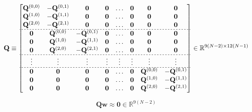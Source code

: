 \begin{equation}\label{eq:Qmat}
\mathbf{Q}
\equiv
\begin{bmatrix}
\mathbf{Q}^{(0,0)} & -\mathbf{Q}^{(0,1)} & \mathbf{0} & \mathbf{0} & \hdots & \mathbf{0} & \mathbf{0} & \mathbf{0}\\
\mathbf{Q}^{(1,0)} & -\mathbf{Q}^{(1,1)} & \mathbf{0} & \mathbf{0} & \hdots & \mathbf{0} & \mathbf{0} & \mathbf{0}\\
\mathbf{Q}^{(2,0)} & -\mathbf{Q}^{(2,1)} & \mathbf{0} & \mathbf{0} & \hdots & \mathbf{0} & \mathbf{0} & \mathbf{0}\\ \hdashline[2pt/2pt]
\mathbf{0} & \mathbf{Q}^{(0,0)} & -\mathbf{Q}^{(0,1)} & \mathbf{0} & \hdots & \mathbf{0} & \mathbf{0} & \mathbf{0}\\
\mathbf{0} & \mathbf{Q}^{(1,0)} & -\mathbf{Q}^{(1,1)} & \mathbf{0} & \hdots & \mathbf{0} & \mathbf{0} & \mathbf{0}\\
\mathbf{0} & \mathbf{Q}^{(2,0)} & -\mathbf{Q}^{(2,1)} & \mathbf{0} & \hdots & \mathbf{0} & \mathbf{0} & \mathbf{0}\\ \hdashline[2pt/2pt]
\vdots     & \vdots             & \vdots             & \vdots     & \vdots & \vdots     & \vdots     & \vdots    \\ \hdashline[2pt/2pt]
\mathbf{0} & \mathbf{0}         & \mathbf{0}         & \mathbf{0} & \hdots & \mathbf{0} & \mathbf{Q}^{(0,0)} & -\mathbf{Q}^{(0,1)}\\
\mathbf{0} & \mathbf{0}         & \mathbf{0}         & \mathbf{0} & \hdots & \mathbf{0} & \mathbf{Q}^{(1,0)} & -\mathbf{Q}^{(1,1)}\\
\mathbf{0} & \mathbf{0}         & \mathbf{0}         & \mathbf{0} & \hdots & \mathbf{0} & \mathbf{Q}^{(2,0)} & -\mathbf{Q}^{(2,1)}\\
\end{bmatrix}
\in \mathbb{R}^{9(N-2)\times 12(N-1)}
\end{equation}

\begin{equation}
\mathbf{Q}
\mathbf{w}
\approx\mathbf{0}\in \mathbb{R}^{9(N-2)}
\end{equation}




